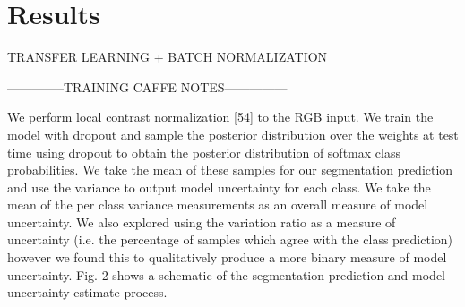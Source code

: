 \chapter{Results}

TRANSFER LEARNING + BATCH NORMALIZATION


\newpage
--------------TRAINING CAFFE NOTES---------------

We perform local contrast normalization [54] to the RGB input. 
We train the model with dropout and sample the posterior distribution over the weights at test time using dropout
to obtain the posterior distribution of softmax class probabilities. We take the mean of these samples for our segmentation prediction and use the variance to output model
uncertainty for each class. We take the mean of the per class
variance measurements as an overall measure of model uncertainty. We also explored using the variation ratio as
a measure of uncertainty (i.e. the percentage of samples
which agree with the class prediction) however we found
this to qualitatively produce a more binary measure of
model uncertainty. Fig. 2 shows a schematic of the segmentation prediction and model uncertainty estimate process.